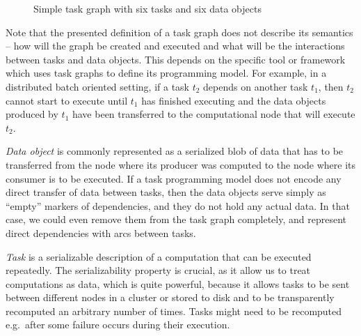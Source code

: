 \begin{figure}[h]
    \centering
    \caption{Simple task graph with six tasks and six data objects}
    \label{fig:task-graph-example}
\end{figure}

Note that the presented definition of a task graph does not describe its semantics -- how will the
graph be created and executed and what will be the interactions between tasks and data objects.
This depends on the specific tool or framework which uses task graphs to define its programming
model. For example, in a distributed batch oriented setting, if a task $t_2$
depends on another task $t_1$, then $t_2$ cannot start to execute
until $t_1$ has finished executing and the data objects produced by
$t_1$ have been transferred to the computational node that will execute
$t_2$.

\emph{Data object} is commonly represented as a serialized blob of data that has to be
transferred from the node where its producer was computed to the node where its consumer is to be
executed. If a task programming model does not encode any direct transfer of data between tasks,
then the data objects serve simply as ``empty'' markers of dependencies, and they do not hold any
actual data. In that case, we could even remove them from the task graph completely, and represent
direct dependencies with arcs between tasks.

\emph{Task} is a serializable description of a computation that can be executed
repeatedly. The serializability property is crucial, as it allow us to treat computations as data,
which is quite powerful, because it allows tasks to be sent between different nodes in a cluster or
stored to disk and to be transparently recomputed an arbitrary number of times. Tasks might need to
be recomputed e.g.\ after some failure occurs during their execution.

